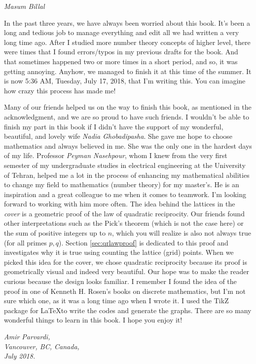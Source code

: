 \documentclass[leqno,12pt]{book}
\begin{document}
\begin{flushright}
	\sl Masum Billal
\end{flushright}

\newpage

In the past three years, we have always been worried about this book. It's been a long and tedious job to manage everything and edit all we had written a very long time ago. After I studied more number theory concepts of higher level, there were times that I found errors/typos in my previous drafts for the book. And that sometimes happened two or more times in a short period, and so, it was getting annoying. Anyhow, we managed to finish it at this time of the summer. It is now 5:36 AM, Tuesday, July 17, 2018, that I'm writing this. You can imagine how crazy this process has made me!

\vspace{0.3cm}
Many of our friends helped us on the way to finish this book, as mentioned in the acknowledgment, and we are so proud to have such friends. I wouldn't be able to finish my part in this book if I didn't have the support of my wonderful, beautiful, and lovely wife \textit{Nadia Ghobadipasha}. She gave me hope to choose mathematics and always believed in me. She was the only one in the hardest days of my life.
\vspace{0.3cm}
Professor \textit{Peyman Nasehpour}, whom I knew from the very first semester of my undergraduate studies in electrical engineering at the University of Tehran, helped me a lot in the process of enhancing my mathematical abilities to change my field to mathematics (number theory) for my master's.  He is an inspiration and a great colleague to me when it comes to teamwork. I'm looking forward to working with him more often.
\vspace{0.3cm}
The idea behind the lattices in the \textit{cover} is a geometric proof of the law of quadratic reciprocity. Our friends found other interpretations such as the Pick's theorem (which is not the case here) or the sum of positive integers up to $n$, which you will realize is also not always true (for all primes $p,q$). Section \eqref{sec:qrlawproof} is dedicated to this proof and investigates why it is true using counting the lattice (grid) points. When we picked this idea for the cover, we chose quadratic reciprocity because its proof is geometrically visual and indeed very beautiful. Our hope was to make the reader curious because the design looks familiar. I remember I found the idea of the proof in one of Kenneth H. Rosen's books on discrete mathematics, but I'm not sure which one, as it was a long time ago when I wrote it. I used the TikZ package for \LaTeX to write the codes and generate the graphs.
\vspace{0.3cm}
There are so many wonderful things to learn in this book. I hope you enjoy it!
\begin{flushright}
	\sl Amir Parvardi,\\
	Vancouver, BC, Canada,\\
	July 2018.
\end{flushright}
\end{document}
